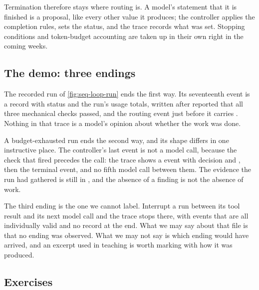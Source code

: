 Termination therefore stays where routing is. A model's statement that it is finished is a proposal,
like every other value it produces; the controller applies the completion rules, sets the status,
and the trace records what was set. Stopping conditions and token-budget accounting are taken up
in their own right in the coming weeks.

\subsection{The demo: three endings}
\label{sec:control-demo}

The recorded run of \cref{fig:seq-loop-run} ends the first way. Its seventeenth event is a
 record with status  and the run's usage totals, written after
 reported that all three mechanical checks passed, and the routing event just before
it carries . Nothing in that trace is a model's opinion about whether the work
was done.

A budget-exhausted run ends the second way, and its shape differs in one instructive place. The
controller's last event is not a model call, because the check that fired precedes the call: the
trace shows a  event with decision  and
, then the terminal event, and no fifth model call between them. The evidence
the run had gathered is still in , and the absence of a finding is not the
absence of work.

The third ending is the one we cannot label. Interrupt a run between its tool result and its next
model call and the trace stops there, with events that are all individually valid and no
 record at the end. What we may say about that file is that no ending was
observed. What we may not say is which ending would have arrived, and an excerpt used in teaching
is worth marking with how it was produced.

\subsection{Exercises}

